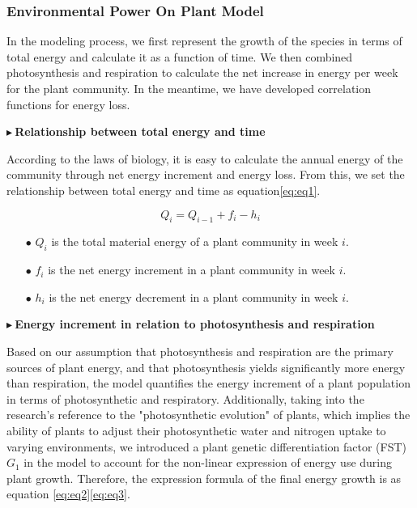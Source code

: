 \documentclass[12pt]{article}  %
\newenvironment{shrinkeq}[1]
{ \bgroup
	\addtolength\abovedisplayshortskip{#1}
	\addtolength\abovedisplayskip{#1}
	\addtolength\belowdisplayshortskip{#1}
	\addtolength\belowdisplayskip{#1}}
{\egroup\ignorespacesafterend}
\begin{document}
\vspace{-0.5cm}
\subsubsection{Environmental Power On Plant Model}

\vspace{-0.5cm}
In the modeling process, we first represent the growth of the species in terms of total energy and calculate it as a function of time. We then combined photosynthesis and respiration to calculate the net increase in energy per week for the plant community. In the meantime, we have developed correlation functions for energy loss. 

\noindent$\blacktriangleright\ $\textbf{\small{Relationship between total energy and time}}

\vspace{-0.2cm}
According to the laws of biology, it is easy to calculate the annual energy of the community through net energy increment and energy loss. From this, we set the relationship between total energy and time as equation\eqref{eq:eq1}.

\vspace{-0.5cm}
\begin{shrinkeq}{-1ex}
	\begin{equation}
    \label{eq:eq1}
	  Q_i=Q_{i-1}+f_i-h_i
	\end{equation}
\end{shrinkeq}
\begin{itemize}
\vspace{-0.4cm}
\item[$\bullet$] \textbf{$Q_i$ }is the total material energy of a plant community in week $i$.
\vspace{-0.2cm}
\item[$\bullet$] \textbf{$f_i$ }is the net energy increment in a plant community in week $i$.
\vspace{-0.2cm}
\item[$\bullet$] \textbf{$h_i$ }is the net energy decrement in a plant community in week $i$.

\end{itemize}

\vspace{-0.2cm}
\noindent$\blacktriangleright\ $\textbf{\small{Energy increment in relation to photosynthesis and respiration}}

\vspace{-0.2cm}
Based on our assumption that photosynthesis and respiration are the primary sources of plant energy, and that photosynthesis yields significantly more energy than respiration, the model quantifies the energy increment of a plant population in terms of photosynthetic and respiratory. Additionally, taking into the research's reference to the "photosynthetic evolution" of plants{\cite{11}}, which implies the ability of plants to adjust their photosynthetic water and nitrogen uptake to varying environments, we introduced a plant genetic differentiation factor (FST) $G_1$ in the model to account for the non-linear expression of energy use during plant growth. Therefore, the expression formula of the final energy growth is as equation \eqref{eq:eq2}\eqref{eq:eq3}.
\end{document}
